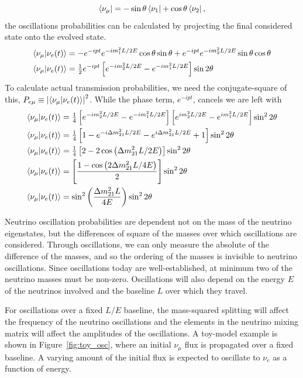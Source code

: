 \documentclass[main.tex]{subfiles}
\begin{document}
\begin{equation}
    \left< \nu_{\mu} \right | = -\sin\theta\left< \nu_{1} \right | + \cos\theta\left< \nu_{2} \right |,
\end{equation}
the oscillations probabilities can be calculated by projecting the final considered state onto the evolved state.
\begin{align}
    \left< \nu_{\mu} | \nu_{e}(t) \right> &= -e^{-ipt}e^{ -im_{1}^{2}L/2E} \cos\theta\sin\theta  + e^{-ipt}e^{ -im_{2}^{2}L/2E} \sin\theta\cos\theta \\
    \left< \nu_{\mu} | \nu_{e}(t) \right> &= \tfrac{1}{2}e^{-ipt}\left[e^{ -im_{2}^{2}L/2E} - e^{ -im_{1}^{2}L/2E}\right] \sin 2\theta
\end{align}
To calculate actual transmission probabilities, we need the conjugate-square of this, $P_{e\mu} \equiv \left|\left< \nu_{\mu}|\nu_{e}(t) \right>\right|^{2}$. While the phase term, $e^{-ipt}$, cancels we are left with 
\begin{align}
    \left< \nu_{\mu} | \nu_{e}(t) \right> &=\tfrac{1}{4} \left[e^{ -im_{2}^{2}L/2E} - e^{ -im_{1}^{2}L/2E}\right]\left[e^{ im_{2}^{2}L/2E} - e^{ im_{1}^{2}L/2E}\right] \sin^{2} 2\theta \\
    \left< \nu_{\mu} | \nu_{e}(t) \right> &=\tfrac{1}{4}\left[1 - e^{-i\Delta m_{21}^{2}L/2E}- e^{i\Delta m_{21}^{2}L/2E}  +1\right]\sin^{2} 2\theta\\
    \left< \nu_{\mu} | \nu_{e}(t) \right> &=\tfrac{1}{4}\left[2- 2\cos\left( \Delta m_{21}^{2}L/2E\right) \right]\sin^{2} 2\theta \\
    \left< \nu_{\mu} | \nu_{e}(t) \right> &=\left[\dfrac{1-\cos\left( 2\Delta m_{21}^{2}L/4E\right)}{2} \right]\sin^{2} 2\theta \\
    \left< \nu_{\mu} | \nu_{e}(t) \right> &=\sin^{2}\left( \dfrac{\Delta m_{21}^{2}L}{4E}\right) \sin^{2} 2\theta
\end{align}

Neutrino oscillation probabilities are dependent not on the mass of the neutrino eigenstates, but the differences of square of the masses over which oscillations are considered.
Through oscillations, we can only measure the absolute of the difference of the masses, and so the ordering of the masses is invisible to neutrino oscillations. 
Since oscillations today are well-established, at minimum two of the neutrino masses must be non-zero. 
Oscillations will also depend on the energy $E$ of the neutrinos involved and the baseline $L$ over which they travel. 

For oscillations over a fixed $L/E$ baseline, the mass-squared splitting will affect the frequency of the neutrino oscillations and the elements in the neutrino mixing matrix will affect the amplitudes of the oscillations. 
A toy-model example is shown in Figure~\ref{fig:toy_osc}, where an initial $\nu_{\mu}$ flux is propagated over a fixed baseline. 
A varying amount of the initial flux is expected to oscillate to $\nu_{e}$ as a function of energy. 
\end{document}
